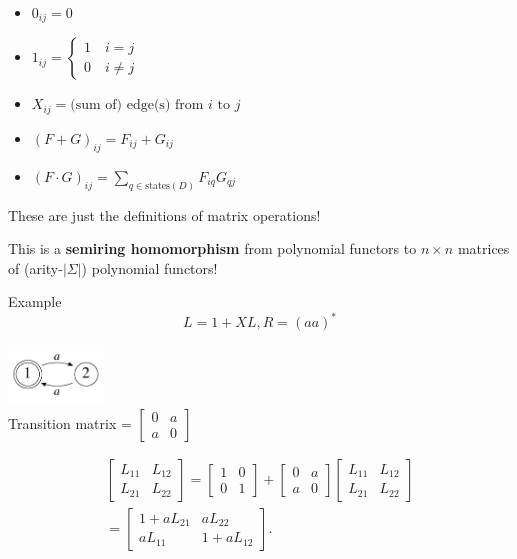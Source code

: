 \documentclass[xcolor=svgnames,12pt]{beamer}
\newenvironment{xframe}[1][]
  {\begin{frame}[fragile,environment=xframe,#1]}
  {\end{frame}}
\renewcommand{\emph}{\textbf}
\begin{document}
\begin{xframe}
  \begin{itemize}
  \item<+-> $0_{ij} = 0$
  \item<+-> $ 1_{ij} = \begin{cases} 1 \quad i = j \\ 0 \quad i \neq
      j \end{cases}$
  \item<+-> $X_{ij} = \text{(sum of) edge(s) from $i$ to $j$}$
  \item<+-> $(F + G)_{ij} = F_{ij} + G_{ij}$
  \item<+-> $(F \cdot G)_{ij} = \sum_{q \in \mathrm{states}(D)} F_{iq} G_{qj}$
  \end{itemize} \bigskip

   These are just the definitions of matrix operations!
\end{xframe}

\begin{xframe}
  \begin{center}
    This is a \emph{semiring homomorphism} from polynomial functors to
    $n \times n$ matrices of (arity-$|\Sigma|$) polynomial functors!
  \end{center}
\end{xframe}

\begin{xframe}{Example}
\[ L = 1 + XL, R = (aa)^* \]
\begin{center}
\includegraphics[width=1in]{even-DFA} \\
Transition matrix = $\begin{bmatrix}
  0 & a \\ a & 0
\end{bmatrix}$

\begin{multline*}
  \begin{bmatrix}
    L_{11} & L_{12} \\
    L_{21} & L_{22}
  \end{bmatrix}
  =
  \begin{bmatrix}
    1 & 0 \\
    0 & 1
  \end{bmatrix}
  +
  \begin{bmatrix}
    0 & a \\
    a & 0
  \end{bmatrix}
  \begin{bmatrix}
    L_{11} & L_{12} \\
    L_{21} & L_{22}
  \end{bmatrix}
  \\
  =
  \begin{bmatrix}
    1 + a L_{21} & a L_{22} \\
    a L_{11} & 1+ a L_{12}
  \end{bmatrix}.
\end{multline*}
\end{center}
\end{xframe}
\end{document}
